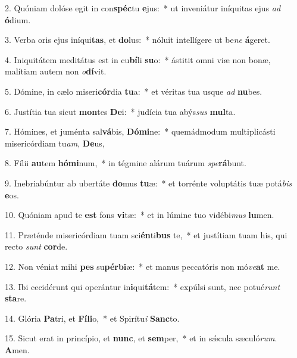 2. Quóniam dolóse egit in con\textbf{spéc}tu \textbf{e}jus:~*  ut inveniátur iníquitas ejus \textit{ad} \textbf{ó}dium.\

3. Verba oris ejus iníqui\textbf{tas}, et \textbf{do}lus:~*  nóluit intellígere ut be\textit{ne} \textbf{á}geret.\

4. Iniquitátem meditátus est in cu\textbf{bí}li \textbf{su}o:~*  ástitit omni viæ non bonæ, malítiam autem non \textit{o}\textbf{dí}vit.\

5. Dómine, in cælo miseri\textbf{cór}dia \textbf{tu}a:~*  et véritas tua usque \textit{ad} \textbf{nu}bes.\

6. Justítia tua sicut \textbf{mon}tes \textbf{De}i:~*  judícia tua abýs\textit{sus} \textbf{mul}ta.\

7. Hómines, et juménta sal\textbf{vá}bis, \textbf{Dó}\textbf{mi}ne:~*  quemádmodum multiplicásti misericórdiam tu\textit{am}, \textbf{De}us,\

8. Fílii \textbf{au}tem \textbf{hó}\textbf{mi}num,~*  in tégmine alárum tuárum \textit{spe}\textbf{rá}bunt.\

9. Inebriabúntur ab ubertáte \textbf{do}mus \textbf{tu}æ:~*  et torrénte voluptátis tuæ potá\textit{bis} \textbf{e}os.\

10. Quóniam apud te \textbf{est} fons \textbf{vi}tæ:~*  et in lúmine tuo vidébi\textit{mus} \textbf{lu}men.\

11. Præténde misericórdiam tuam sci\textbf{én}ti\textbf{bus} te,~*  et justítiam tuam his, qui recto \textit{sunt} \textbf{cor}de.\

12. Non véniat mihi \textbf{pes} su\textbf{pér}\textbf{bi}æ:~*  et manus peccatóris non mó\textit{ve}\textbf{at} me.\

13. Ibi cecidérunt qui operántur in\textbf{i}qui\textbf{tá}tem:~*  expúlsi sunt, nec potué\textit{runt} \textbf{sta}re.\

14. Glória \textbf{Pa}tri, et \textbf{Fí}\textbf{li}o,~*  et Spirítu\textit{i} \textbf{Sanc}to.\

15. Sicut erat in princípio, et \textbf{nunc}, et \textbf{sem}per,~*  et in sǽcula sæculó\textit{rum}. \textbf{A}men.\


